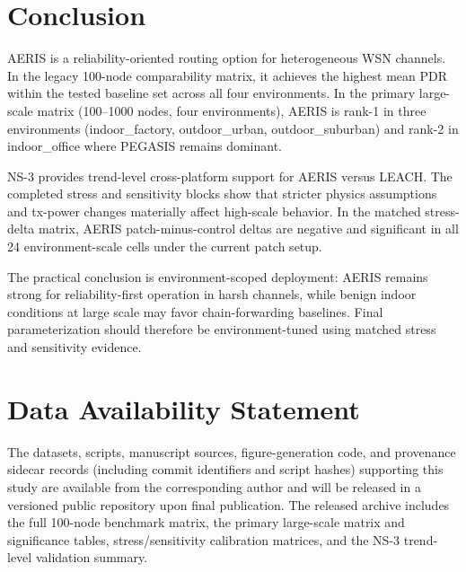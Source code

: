 ﻿\documentclass[sensors,article,submit,moreauthors,pdftex]{Definitions/mdpi}
\begin{document}
\section{Conclusion}
AERIS is a reliability-oriented routing option for heterogeneous WSN channels. In the legacy 100-node comparability matrix, it achieves the highest mean PDR within the tested baseline set across all four environments. In the primary large-scale matrix (100--1000 nodes, four environments), AERIS is rank-1 in three environments (indoor\_factory, outdoor\_urban, outdoor\_suburban) and rank-2 in indoor\_office where PEGASIS remains dominant.

NS-3 provides trend-level cross-platform support for AERIS versus LEACH. The completed stress and sensitivity blocks show that stricter physics assumptions and tx-power changes materially affect high-scale behavior. In the matched stress-delta matrix, AERIS patch-minus-control deltas are negative and significant in all 24 environment-scale cells under the current patch setup.

The practical conclusion is environment-scoped deployment: AERIS remains strong for reliability-first operation in harsh channels, while benign indoor conditions at large scale may favor chain-forwarding baselines. Final parameterization should therefore be environment-tuned using matched stress and sensitivity evidence.

\section*{Data Availability Statement}
The datasets, scripts, manuscript sources, figure-generation code, and provenance sidecar records (including commit identifiers and script hashes) supporting this study are available from the corresponding author and will be released in a versioned public repository upon final publication. The released archive includes the full 100-node benchmark matrix, the primary large-scale matrix and significance tables, stress/sensitivity calibration matrices, and the NS-3 trend-level validation summary.


\end{document}
